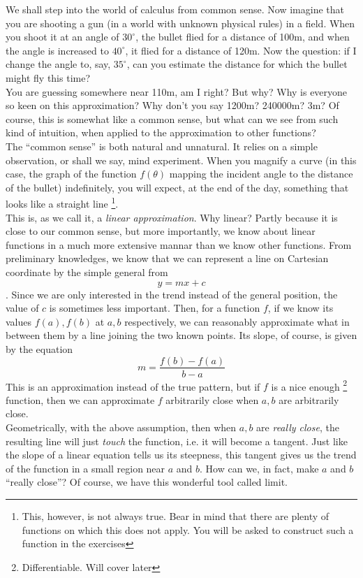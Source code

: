 We shall step into the world of calculus from common sense.
Now imagine that you are shooting a gun (in a world with unknown physical rules) in a field.
When you shoot it at an angle of $30^\circ$, the bullet flied for a distance of 100m, and when the angle is increased to $40^\circ$, it flied for a distance of 120m.
Now the question: if I change the angle to, say, $35^\circ$, can you estimate the distance for which the bullet might fly this time?\\
You are guessing somewhere near 110m, am I right? But why? Why is everyone so keen on this approximation? Why don't you say 1200m? 240000m? 3m?
Of course, this is somewhat like a common sense, but what can we see from such kind of intuition, when applied to the approximation to other functions?\\
The ``common sense'' is both natural and unnatural. It relies on a simple observation, or shall we say, mind experiment. When you magnify a curve (in this case, the graph of the function
$f(\theta)$ mapping the incident angle to the distance of the bullet) indefinitely, you will expect, at the end of the day, something that looks like a straight line
\footnote{This, however, is not always true. Bear in mind that there are plenty of functions on which this does not apply. You will be asked to construct such a function in the exercises}.\\
This is, as we call it, a \textit{linear approximation}. Why linear?
Partly because it is close to our common sense, but more importantly, we know about linear functions in a much more extensive mannar than we know other functions.
From preliminary knowledges, we know that we can represent a line on Cartesian coordinate by the simple general from
$$y=mx+c$$.
Since we are only interested in the trend instead of the general position, the value of $c$ is sometimes less important.
Then, for a function $f$, if we know its values $f(a), f(b)$ at $a,b$ respectively, we can reasonably approximate what in between them by a line joining the two known points.
Its slope, of course, is given by the equation
$$m=\frac{f(b)-f(a)}{b-a}$$
This is an approximation instead of the true pattern, but if $f$ is a nice enough
\footnote{Differentiable. Will cover later}
function, then we can approximate $f$ arbitrarily close when $a,b$ are arbitrarily close.\\
Geometrically, with the above assumption, then when $a,b$ are \textit{really close}, the resulting line will just \textit{touch} the function,
i.e. it will become a tangent.
Just like the slope of a linear equation tells us its steepness, this tangent gives us the trend of the function in a small region near $a$ and $b$.
How can we, in fact, make $a$ and $b$ ``really close''?
Of course, we have this wonderful tool called limit.